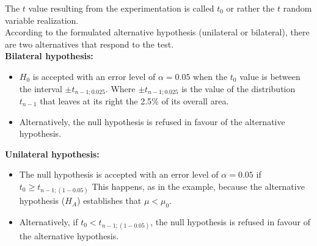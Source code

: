 \begin{frame}
  \begin{small}
    The $ t $ value resulting from the experimentation is called $ t_0 $ or rather the $ t $ random variable realization.\\
    According to the formulated alternative hypothesis (unilateral or bilateral), there are two alternatives that respond to the test.\\
    \vspace*{.2cm}
    \textbf{Bilateral hypothesis:}
    \vspace*{-.3cm}
    \begin{itemize}
      \item $ H_0 $ is accepted with an error level of $ \alpha = 0.05 $ when the $ t_0 $ value is between the interval $ \pm t_{n-1;0.025} $. Where $ \pm t_{n-1;0.025} $ is the value of the distribution $ t_{n-1} $ that leaves at its right the 2.5$ \% $ of its overall area.
      \item Alternatively, the null hypothesis is refused in favour of the alternative hypothesis.
    \end{itemize}
    \textbf{Unilateral hypothesis:}
    \vspace*{-.3cm}
    \begin{itemize}
      \item The null hypothesis is accepted with an error level of $ \alpha = 0.05 $ if $ t_0 \geq t_{n-1;(1-0.05)} $ This happens, as in the example, because the alternative hypothesis ($ H_A $) establishes that  $ \mu < \mu_0 $.
      \item Alternatively, if $ t_0 < t_{n-1;(1-0.05)} $, the null hypothesis is refused in favour of the alternative hypothesis.
    \end{itemize}
  \end{small}
\end{frame}


